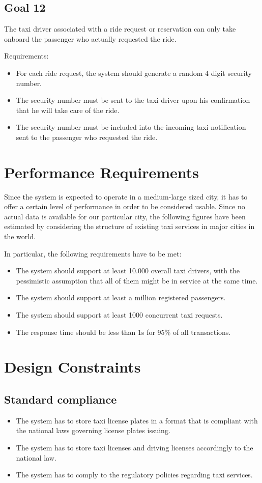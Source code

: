 \subsection{Goal 12}
The taxi driver associated with a ride request or reservation can only take onboard the passenger who actually requested the ride.

Requirements:
\begin{itemize}
\item For each ride request, the system should generate a random 4 digit security number.
\item The security number must be sent to the taxi driver upon his confirmation that he will take care of the ride.
\item The security number must be included into the incoming taxi notification sent to the passenger who requested the ride.
\end{itemize}


\section{Performance Requirements}
Since the system is expected to operate in a medium-large sized city, it has to offer a certain level of performance in order to be considered usable. Since no actual data is available for our particular city, the following figures have been estimated by considering the structure of existing taxi services in major cities in the world.

In particular, the following requirements have to be met:
\begin{itemize}
\item The system should support at least 10.000 overall taxi drivers, with the pessimistic assumption that all of them might be in service at the same time.
\item The system should support at least a million registered passengers.
\item The system should support at least 1000 concurrent taxi requests.
\item The response time should be less than 1s for 95\% of all transactions.
\end{itemize}


\section{Design Constraints}
\subsection{Standard compliance}
\begin{itemize}
\item The system has to store taxi license plates in a format that is compliant with the national laws governing license plates issuing. 
\item The system has to store taxi licenses and driving licenses accordingly to the national law.
\item The system has to comply to the regulatory policies regarding taxi services. 
\end{itemize}


